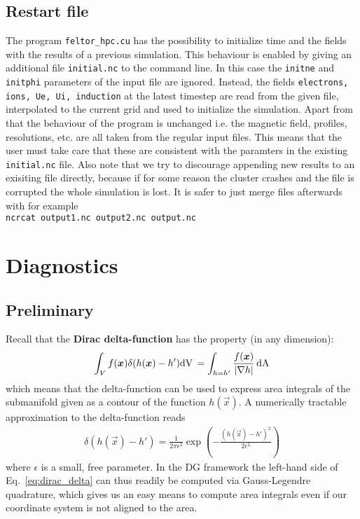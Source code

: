 \subsection{Restart file} \label{sec:restart_file}
The program \texttt{feltor\_hpc.cu} has the possibility to initialize time and the fields with
the results of a previous simulation. This behaviour is enabled by giving an additional file \texttt{initial.nc}
to the command line. In this case the \texttt{initne} and \texttt{initphi} parameters of the input
file are ignored. Instead, the fields \texttt{electrons, ions, Ue, Ui, induction} at the latest timestep
are read from the given file, interpolated to the current grid and used to initialize the simulation.
Apart from that the behaviour of the program is unchanged i.e. the magnetic field, profiles, resolutions, etc.
are all taken from the regular input files. This means that the user must take care that these are consistent
with the paramters in the existing \texttt{initial.nc} file. Also note that we try to discourage
appending new results to an exisiting file directly,
because if for some reason the cluster crashes and the file is corrupted
the whole simulation is lost. It is safer to just merge files afterwards with for example\\
\texttt{ncrcat output1.nc output2.nc output.nc}
\section{Diagnostics}\label{sec:diagnostics}
\subsection{Preliminary}
Recall that the {\bf Dirac delta-function} has the property (in any dimension):
\begin{align} \label{eq:dirac_delta}
\int_V f({\boldsymbol{x}}) \delta(h({\boldsymbol{x}}) - h') \mathrm{dV}\, = \int_{h=h'} \frac{f({\boldsymbol{x}})}{|\nabla h|} \,\mathrm{dA}
\end{align}
which means that the delta-function can be used to express area integrals of the
submanifold given as a contour of the function $h(\vec x)$.
A numerically tractable approximation to the delta-function reads
\begin{align}\label{eq:delta}
\delta(h(\vec x)-h') = \frac{1}{2\pi \epsilon^2}
\exp\left( - \frac{\left(h(\vec x)-h'\right)^2}{2\epsilon^2}\right)
\end{align}
where $\epsilon$ is a small, free parameter.
In the DG framework the left-hand side
of Eq.~\eqref{eq:dirac_delta} can thus readily be computed
via Gauss-Legendre quadrature, which gives us an easy means to compute area
integrals even if our coordinate system is not aligned to the area.

